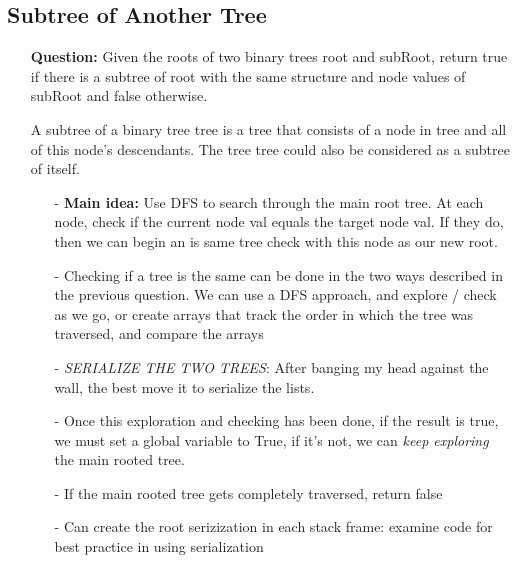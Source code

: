 \documentclass[12pt]{article}
\begin{document}
\subsection{Subtree of Another Tree}
\begin{enumerate}
  \item[] \textbf{Question:} Given the roots of two binary trees root and subRoot, return true if there is a subtree of root with the same structure and node values of subRoot and false otherwise.

A subtree of a binary tree tree is a tree that consists of a node in tree and all of this node's descendants. The tree tree could also be considered as a subtree of itself.



    \begin{enumerate}
      \item[-] \textbf{Main idea:} Use DFS to search through the main root tree. At each node, check if the current node val equals the target node val. If they do, then we can begin an is same tree check with this node as our new root. 
      \item[-] Checking if a tree is the same can be done in the two ways described in the previous question. We can use a DFS approach, and explore / check as we go, or create arrays that track the order in which the tree was traversed, and compare the arrays
      \item[-] \textit{SERIALIZE THE TWO TREES}: After banging my head against the wall, the best move it to serialize the lists.
      \item[-] Once this exploration and checking has been done, if the result is true, we must set a global variable to True, if it's not, we can  \textit{keep exploring} the main rooted tree. 
      \item[-] If the main rooted tree gets completely traversed, return false
      \item[-] Can create the root serizization in each stack frame: examine code for best practice in using serialization

    \end{enumerate}
\end{enumerate}
\end{document}
